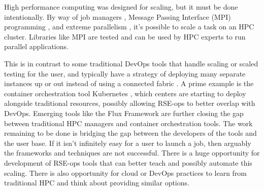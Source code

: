 High performance computing was designed for scaling, but it must be done intentionally. By way of job managers \cite{slurm,flux}, Message Passing Interface (MPI) programming \cite{mpi}, and extreme parallelism \cite{insidehpc-hpc}, it's possible to scale a task on an HPC cluster. Libraries like MPI are tested and can be used by HPC experts to run parallel applications.

This is in contrast to some traditional DevOps tools that handle scaling or scaled testing for the user, and typically have a strategy of deploying many separate instances up or out instead of using a connected fabric \cite{Reese_undated-rm}. A prime example is the container orchestration tool Kubernetes \cite{k8}, which centers are starting to deploy alongside traditional resources, possibly allowing RSE-ops to better overlap with DevOps. Emerging tools like the Flux Framework \cite{flux} are further closing the gap between traditional HPC managers and container orchestration tools. The work remaining to be done is bridging the gap between the developers of the tools and the user base. If it isn't infinitely easy for a user to launch a job, then arguably the frameworks and techniques are not successful. There is a huge opportunity for development of RSE-ops tools that can better teach and possibly automate this scaling. There is also opportunity for cloud or DevOps practices to learn from traditional HPC and think about providing similar options.

